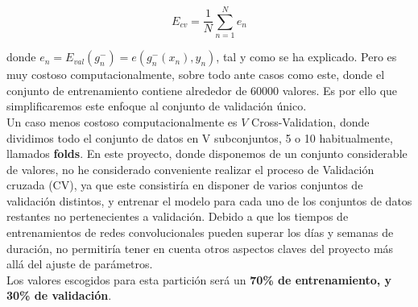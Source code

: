 $$E_{cv} = \frac{1}{N}\sum^{N}_{n=1} e_n$$

donde $e_n = E_{val}(g^-_n) = e(g_n^-(x_n),y_n)$, tal y como se ha explicado. Pero es muy costoso computacionalmente, sobre todo ante casos como este, donde el conjunto de entrenamiento contiene alrededor de 60000 valores. Es por ello que simplificaremos este enfoque al conjunto de validación único.\\

Un caso menos costoso computacionalmente es $V$ Cross-Validation, donde dividimos todo el conjunto de datos en V subconjuntos, 5 o 10 habitualmente, llamados \textbf{folds}. En este proyecto, donde disponemos de un conjunto considerable de valores, no he considerado conveniente realizar el proceso de Validación cruzada (CV), ya que este consistiría en disponer de varios conjuntos de validación distintos, y entrenar el modelo para cada uno de los conjuntos de datos restantes no pertenecientes a validación. Debido a que los tiempos de entrenamientos de redes convolucionales pueden superar los días y semanas de duración, no permitiría tener en cuenta otros aspectos claves del proyecto más allá del ajuste de parámetros.\\

Los valores escogidos para esta partición será un \textbf{70\% de entrenamiento, y 30\% de validación}.
